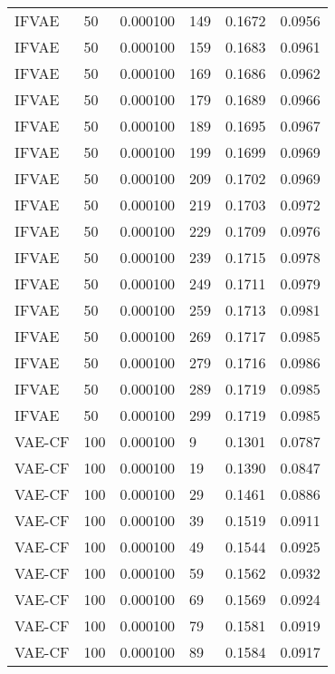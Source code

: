 \begin{tabular}{llrlrr}
   IFVAE &   50 &  0.000100 &   149 &  0.1672 &       0.0956 \\
   IFVAE &   50 &  0.000100 &   159 &  0.1683 &       0.0961 \\
   IFVAE &   50 &  0.000100 &   169 &  0.1686 &       0.0962 \\
   IFVAE &   50 &  0.000100 &   179 &  0.1689 &       0.0966 \\
   IFVAE &   50 &  0.000100 &   189 &  0.1695 &       0.0967 \\
   IFVAE &   50 &  0.000100 &   199 &  0.1699 &       0.0969 \\
   IFVAE &   50 &  0.000100 &   209 &  0.1702 &       0.0969 \\
   IFVAE &   50 &  0.000100 &   219 &  0.1703 &       0.0972 \\
   IFVAE &   50 &  0.000100 &   229 &  0.1709 &       0.0976 \\
   IFVAE &   50 &  0.000100 &   239 &  0.1715 &       0.0978 \\
   IFVAE &   50 &  0.000100 &   249 &  0.1711 &       0.0979 \\
   IFVAE &   50 &  0.000100 &   259 &  0.1713 &       0.0981 \\
   IFVAE &   50 &  0.000100 &   269 &  0.1717 &       0.0985 \\
   IFVAE &   50 &  0.000100 &   279 &  0.1716 &       0.0986 \\
   IFVAE &   50 &  0.000100 &   289 &  0.1719 &       0.0985 \\
   IFVAE &   50 &  0.000100 &   299 &  0.1719 &       0.0985 \\
  VAE-CF &  100 &  0.000100 &     9 &  0.1301 &       0.0787 \\
  VAE-CF &  100 &  0.000100 &    19 &  0.1390 &       0.0847 \\
  VAE-CF &  100 &  0.000100 &    29 &  0.1461 &       0.0886 \\
  VAE-CF &  100 &  0.000100 &    39 &  0.1519 &       0.0911 \\
  VAE-CF &  100 &  0.000100 &    49 &  0.1544 &       0.0925 \\
  VAE-CF &  100 &  0.000100 &    59 &  0.1562 &       0.0932 \\
  VAE-CF &  100 &  0.000100 &    69 &  0.1569 &       0.0924 \\
  VAE-CF &  100 &  0.000100 &    79 &  0.1581 &       0.0919 \\
  VAE-CF &  100 &  0.000100 &    89 &  0.1584 &       0.0917 \\

\end{tabular}
